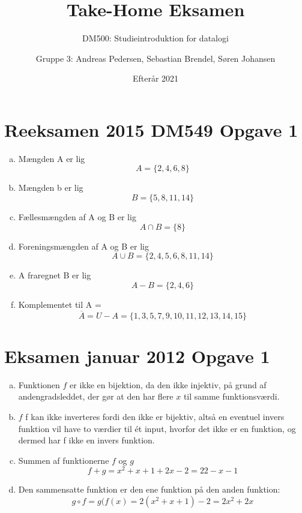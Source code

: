 \documentclass[a4paper, oneside]{scrartcl}
\title{Take-Home Eksamen}
\subtitle{DM500: Studieintroduktion for datalogi}
\date{Efterår 2021}
\author{Gruppe 3: Andreas Pedersen, Sebastian Brendel, Søren Johansen}
\begin{document}
\maketitle  
\section*{Reeksamen 2015 DM549 Opgave 1}
\begin{enumerate}[a)]
\item Mængden A er lig \[A = \{2, 4, 6, 8\}\]

\item Mængden b er lig \[B = \{5, 8, 11, 14\}\]

\item Fællesmængden af A og B er lig \[A \cap B = \{8\}\]

\item Foreningsmængden af A og B er lig \[A \cup B = \{2, 4, 5, 6, 8, 11, 14\}\]

\item A fraregnet B er lig \[A - B = \{2, 4, 6\}\]

\item Komplementet til A = \[\overline{A} = U - A = \{1, 3, 5, 7, 9, 10, 11,12, 13, 14, 15\}\]
\end{enumerate}

\section*{Eksamen januar 2012 Opgave 1}

\begin{enumerate}[a)]
    \item Funktionen \(f\) er ikke en bijektion, da den ikke injektiv, på grund af andengradsleddet, der gør at den har flere \(x\) til samme funktionsværdi.
    \item \(f\) f kan ikke inverteres fordi den ikke er bijektiv, altså en eventuel invers funktion vil have to værdier til ét input, hvorfor det ikke er en funktion, og dermed har f ikke en invers funktion.
    \item Summen af funktionerne \( f\) og \(g\) \[f + g = x^2 + x + 1 + 2x -2 = 22 -x -1\]
    \item Den sammensatte funktion er den ene funktion på den anden funktion: \[ g \circ f = g(f(x) = 2(x^2 + x + 1) - 2 = 2x^2 + 2x \]

\end{enumerate}
\end{document}
